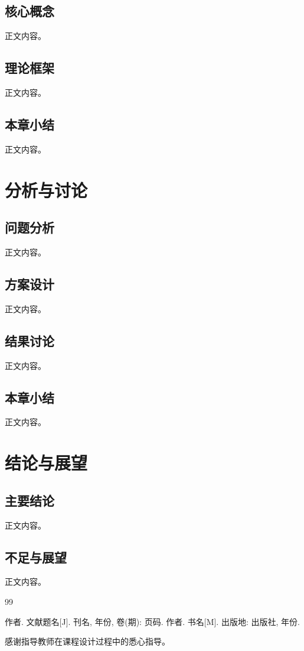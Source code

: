 \documentclass{gdut-thesis}
\begin{document}
\section{核心概念}
正文内容。

\section{理论框架}
正文内容。

\section{本章小结}
正文内容。

\chapter{分析与讨论}

\section{问题分析}
正文内容。

\section{方案设计}
正文内容。

\section{结果讨论}
正文内容。

\section{本章小结}
正文内容。

\chapter{结论与展望}

\section{主要结论}
正文内容。

\section{不足与展望}
正文内容。

\begin{thebibliography}{99}

 作者. 文献题名[J]. 刊名, 年份, 卷(期): 页码.
 作者. 书名[M]. 出版地: 出版社, 年份.

\end{thebibliography}

\begin{acknowledgments}

感谢指导教师在课程设计过程中的悉心指导。

\end{acknowledgments}
\end{document}
